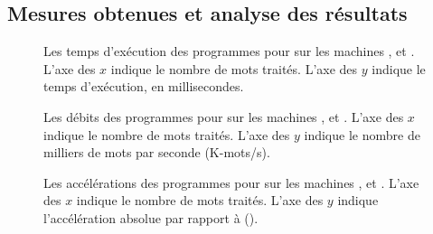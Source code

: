 \subsection{Mesures obtenues et analyse des r\'esultats}



\begin{figure}



\caption[Les temps d'exécution des programmes pour  sur
les machines ,  et .]{Les temps d'exécution des programmes
pour  sur les machines ,  et . L'axe des $x$
indique le nombre de mots traités. L'axe des $y$ indique le temps
d'exécution, en millisecondes.}
\label{WordCount-temps.fig}
\end{figure}


\begin{figure}



\caption[Les débits pour  sur
les machines ,  et .]{Les débits des programmes
pour  sur les machines ,  et . L'axe des $x$
indique le nombre de mots traités. L'axe des $y$ indique le nombre de
milliers de mots par seconde (K-mots/s).}
\label{WordCount-debits.fig}
\end{figure}


\begin{figure}



\caption[Les accélérations pour  sur les machines ,
 et .]{Les accélérations des programmes pour  sur
les machines ,  et . L'axe des $x$ indique le nombre de mots
traités. L'axe des $y$ indique l'accélération absolue par rapport à
 ().}
\label{WordCount-accs.fig}
\end{figure}


